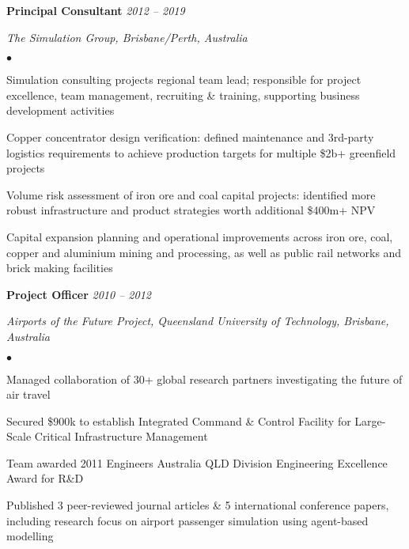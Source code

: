 \documentclass[margin,line]{resume}
\newenvironment{list1}{
  \begin{list}{}{%
      \setlength{\itemsep}{0in}
      \setlength{\parsep}{0in} \setlength{\parskip}{0in}
      \setlength{\topsep}{0in} \setlength{\partopsep}{0in}
      \setlength{\leftmargin}{0.17in}}}{\end{list}}
\newenvironment{list2}{
  \begin{list}{$\bullet$}{%
      \setlength{\itemsep}{0in}
      \setlength{\parsep}{0in} \setlength{\parskip}{0in}
      \setlength{\topsep}{0in} \setlength{\partopsep}{0in}
      \setlength{\leftmargin}{0.2in}}}{\end{list}}
\begin{document}
\begin{resume}
{\textbf{Principal Consultant}} \hfill {\it 2012 -- 2019}\\
\vspace{-0.85\baselineskip}
\begin{list1}
\item {\it The Simulation Group, Brisbane/Perth, Australia}
\begin{list2}
\item Simulation consulting projects regional team lead; responsible for project excellence, team management, recruiting \& training, supporting business development activities
\item Copper concentrator design verification: defined maintenance and 3rd-party logistics requirements to achieve production targets for multiple \$2b+ greenfield projects
\item Volume risk assessment of iron ore and coal capital projects: identified more robust infrastructure and product strategies worth additional \$400m+ NPV
\item Capital expansion planning and operational improvements across iron ore, coal, copper and aluminium mining and processing, as well as public rail networks and brick making facilities
\end{list2}
\end{list1}

\newpage

{\textbf{Project Officer}} \hfill {\it 2010 -- 2012}\\
\vspace{-0.85\baselineskip}
\begin{list1}
\item {\it Airports of the Future Project, Queensland University of Technology, Brisbane, Australia}
\begin{list2}
\item Managed collaboration of 30+ global research partners investigating the future of air travel
\item Secured \$900k to establish Integrated Command \& Control Facility for Large-Scale Critical Infrastructure Management
\item Team awarded 2011 Engineers Australia QLD Division Engineering Excellence Award for R\&D
\item Published 3 peer-reviewed journal articles \& 5 international conference papers, including research focus on airport passenger simulation using agent-based modelling
\end{list2}
\end{list1}


\end{resume}
\end{document}
